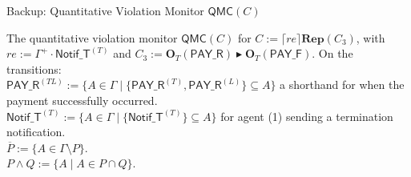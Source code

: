\documentclass[9pt,aspectratio=169]{beamer}
\newcommand{\repair}{\ensuremath{\blacktriangleright}}
\newcommand{\obl}[2][]{\mathbf{O}_{#1}(#2)}
\newcommand{\repit}[1]{\mathbf{Rep}(#1)}
\newcommand{\guard}[2][]{\lceil #1 \rceil #2}
\newcommand{\qmc}{\ensuremath{\mathsf{QMC}}}
\newcommand{\PAY}{\ensuremath{\mathsf{PAY\_R}}\xspace}
\newcommand{\PAYF}{\ensuremath{\mathsf{PAY\_F}}\xspace}
\newcommand{\notifterm}{\ensuremath{\mathsf{Notif\_T}}}
\begin{document}
\begin{frame}{Backup: Quantitative Violation Monitor $\qmc(C)$}
  \vspace{3mm}
  \begin{block}{}
    \scriptsize
    The quantitative violation monitor $\qmc(C)$ for $C := \guard[re]{\repit{C_3}}$, with $re:=\Gamma^+ \cdot \notifterm^{(T)} $ and $C_3:= \obl[T]{\PAY} \repair \obl[T]{\PAYF}$. On the transitions:\\
    $\PAY^{(TL)}:=\{A \in \Gamma \mid \{\PAY^{(T)}, \PAY^{(L)}\} \subseteq A\}$ a shorthand for when the payment successfully occurred.\\
    $\notifterm^{(T)}:=\{A \in \Gamma \mid \{\notifterm^{(T)}\} \subseteq A\}$ for agent (1) sending a termination notification.\\
    $ \overline{P}:= \{A \in \Gamma \setminus P\}.$\\
    $P \wedge Q := \{A \mid A \in P \cap Q\}.$
  \end{block}
\end{frame}
\end{document}

